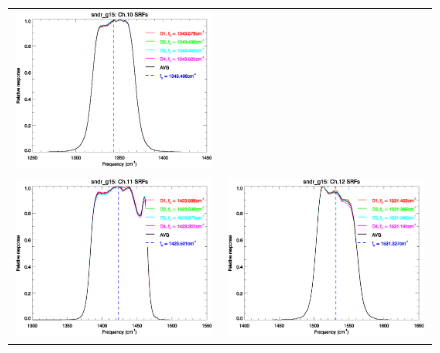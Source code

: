 \begin{figure}[htp]
\begin{tabular}{c c}
    \includegraphics[scale=0.5]{graphics/nominal/sndr_g15.ch10.srf.eps} \\
    \includegraphics[scale=0.5]{graphics/nominal/sndr_g15.ch11.srf.eps} &
    \includegraphics[scale=0.5]{graphics/nominal/sndr_g15.ch12.srf.eps}

\end{tabular}
\end{figure}

